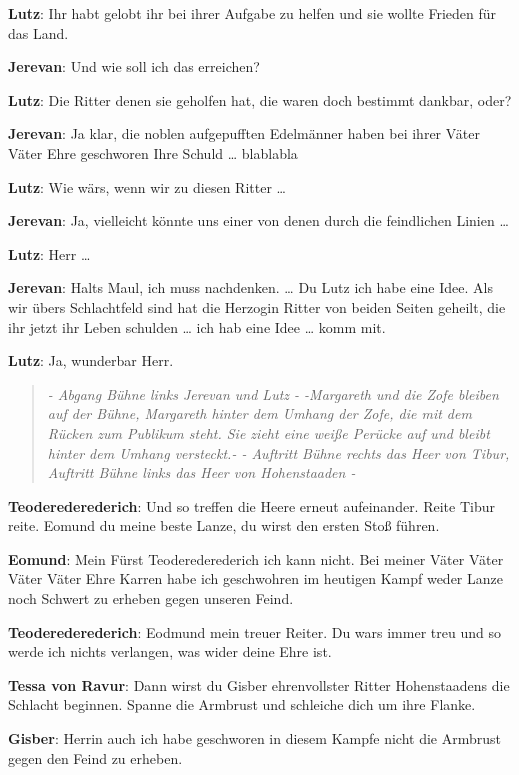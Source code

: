 \documentclass[a5paper,7pt, twocolumn]{book}
\begin{document}
\textbf{Lutz}: Ihr habt gelobt ihr bei ihrer Aufgabe zu helfen und sie wollte Frieden für das Land.

\textbf{Jerevan}: Und wie soll ich das erreichen?

\textbf{Lutz}: Die Ritter denen sie geholfen hat, die waren doch bestimmt dankbar, oder?

\textbf{Jerevan}: Ja klar, die noblen aufgepufften Edelmänner haben bei ihrer Väter Väter Ehre geschworen Ihre Schuld … blablabla

\textbf{Lutz}: Wie wärs, wenn wir zu diesen Ritter …

\textbf{Jerevan}: Ja, vielleicht könnte uns einer von denen durch die feindlichen Linien …

\textbf{Lutz}: Herr …

\textbf{Jerevan}: Halts Maul, ich muss nachdenken. … Du Lutz ich habe eine Idee. Als wir übers Schlachtfeld sind hat die Herzogin Ritter von beiden Seiten geheilt, die ihr jetzt ihr Leben schulden … ich hab eine Idee … komm mit.

\textbf{Lutz}: Ja, wunderbar Herr.

\begin{quote}
  \textit{- Abgang Bühne links Jerevan und Lutz -
-Margareth und die Zofe bleiben auf der Bühne, Margareth hinter dem Umhang der Zofe, die mit dem Rücken zum Publikum steht. Sie zieht eine weiße Perücke auf und bleibt hinter dem Umhang versteckt.-
- Auftritt Bühne rechts das Heer von Tibur, Auftritt Bühne links das Heer von Hohenstaaden -
}
 \end{quote}

\textbf{Teoderederederich}: Und so treffen die Heere erneut aufeinander. Reite Tibur reite. Eomund du meine beste Lanze, du wirst den ersten Stoß führen.

\textbf{Eomund}: Mein Fürst Teoderederederich ich kann nicht. Bei meiner Väter Väter Väter Väter Ehre Karren habe ich geschwohren im heutigen Kampf weder Lanze noch Schwert zu erheben gegen unseren Feind.

\textbf{Teoderederederich}: Eodmund mein treuer Reiter. Du wars immer treu und so werde ich nichts verlangen, was wider deine Ehre ist.

\textbf{Tessa von Ravur}: Dann wirst du Gisber ehrenvollster Ritter Hohenstaadens die Schlacht beginnen. Spanne die Armbrust und schleiche dich um ihre Flanke.

\textbf{Gisber}: Herrin auch ich habe geschworen in diesem Kampfe nicht die Armbrust gegen den Feind zu erheben.
\end{document}
